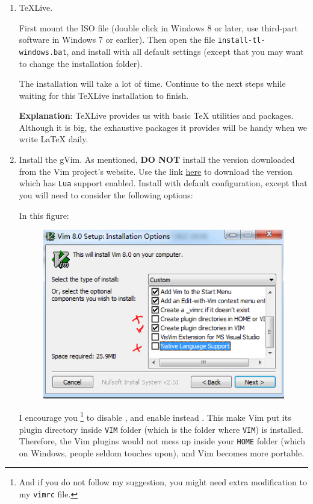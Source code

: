 \documentclass{article}
\begin{document}
\begin{enumerate}
    \item \TeX Live.

        First mount the ISO file (double click in Windows 8 or later,
        use third-part software in Windows 7 or earlier). Then open
        the file \texttt{install-tl-windows.bat}, and install with all
        default settings (except that you may want to change the
        installation folder).

        The installation will take a lot of time. Continue to the next
        steps while waiting for this \TeX Live installation to finish.

        \textbf{Explanation}: \TeX Live provides us with basic \TeX
        utilities and packages. Although it is big, the exhaustive
        packages it provides will be handy when we write \LaTeX{} daily.

    \item Install the gVim. As mentioned, \textbf{DO NOT} install the
        version downloaded from the Vim project's website. Use the
        link
        \href{https://github.com/vim/vim-win32-installer/releases/}{here}
        to download the version which has \texttt{Lua} support
        enabled. Install with default configuration, except that you 
        will need to consider the following options:

        In this figure:
        \begin{figure}[H]
            \centering
            \includegraphics[width=0.6\linewidth]{pics/1.PNG}
        \end{figure}
        I encourage you
        \footnote{And if you do not follow my suggestion, you might
            need extra modification to my \texttt{vimrc} file.}
        to disable , and enable instead .  This make Vim put
        its plugin directory inside \texttt{VIM} folder (which is the
        folder where \texttt{VIM}) is installed.  Therefore, the Vim
        plugins would not mess up inside your \texttt{HOME} folder
        (which on Windows, people seldom touches upon), and Vim
        becomes more portable.


\end{enumerate}
\end{document}
